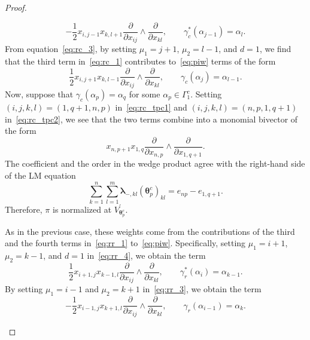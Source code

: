 \documentclass[11pt]{article}
\newcommand{\blambda}{\boldsymbol{\lambda}}
\newcommand{\btheta}{{\boldsymbol{\theta}}}
\theoremstyle{definition}\newtheorem{definition}[theorem]{Definition}
\theoremstyle{definition}\newtheorem{remark}[theorem]{Remark}
\theoremstyle{remark}
\numberwithin{equation}{section}
\begin{document}
\begin{proof}
\begin{description}
        \begin{equation}\label{eq:rc_tpc1}
            -\frac{1}{2}x_{i,j-1} x_{k,l+1} \frac{\partial}{\partial x_{ij}}\wedge \frac{\partial}{\partial x_{kl}}, \qquad \gamma_c^*(\alpha_{j-1}) = \alpha_l.
        \end{equation}
        From equation~\eqref{eq:rc_3}, by setting $\mu_1 = j+1$, $\mu_2 = l-1$, and $d = 1$, we find that the third term in~\eqref{eq:rc_1} contributes to~\eqref{eq:piw} terms of the form
        \begin{equation}\label{eq:rc_tpc2}
            \frac{1}{2}x_{i,j+1}x_{k,l-1} \frac{\partial}{\partial x_{ij}}\wedge \frac{\partial}{\partial x_{kl}}, \qquad \gamma_c(\alpha_j) = \alpha_{l-1}. 
        \end{equation}
        Now, suppose that $\gamma_c(\alpha_p) = \alpha_q$ for some $\alpha_p \in \Gamma_1^c$. Setting $(i,j,k,l) = (1,q+1,n,p)$ in~\eqref{eq:rc_tpc1} and $(i,j,k,l) = (n,p,1,q+1)$ in~\eqref{eq:rc_tpc2}, we see that the two terms combine into a monomial bivector of the form
        \begin{equation*}
            x_{n,p+1} x_{1,q} \frac{\partial}{\partial x_{n,p}}\wedge \frac{\partial}{\partial x_{1,q+1}}.
        \end{equation*}
        The coefficient and the order in the wedge product agree with the right-hand side of the LM equation
        \begin{equation*}                 \sum_{k=1}^n\sum_{l=1}^m\blambda_{-,kl}( \btheta_{p}^c)_{kl} = e_{np}-e_{1,q+1}.
        \end{equation*}
        Therefore, $\pi$ is normalized at $V_{\btheta_{p}^c}^\prime$.
        \item[Terms of weights $\btheta_p^r$.] As in the previous case, these weights come from the contributions of the third and the fourth terms in~\eqref{eq:rr_1} to~\eqref{eq:piw}. Specifically, setting $\mu_1 = i+1$, $\mu_2 = k-1$, and $d = 1$ in~\eqref{eq:rr_4}, we obtain the term
        \begin{equation}\label{eq:rr_tpc1}
            \frac{1}{2}x_{i+1,j}x_{k-1,l} \frac{\partial}{\partial x_{ij}}\wedge\frac{\partial}{\partial x_{kl}}, \qquad \gamma_r^*(\alpha_i) = \alpha_{k-1}.
        \end{equation}
        By setting $\mu_1 = i-1$ and $\mu_2 = k+1$ in~\eqref{eq:rr_3}, we obtain the term  
        \begin{equation}\label{eq:rr_tpc2}
            -\frac{1}{2}x_{i-1,j}x_{k+1,l} \frac{\partial}{\partial x_{ij}}\wedge \frac{\partial}{\partial x_{kl}}, \qquad \gamma_r(\alpha_{i-1}) = \alpha_k.

\end{equation}
\end{description}
\end{proof}
\end{document}
